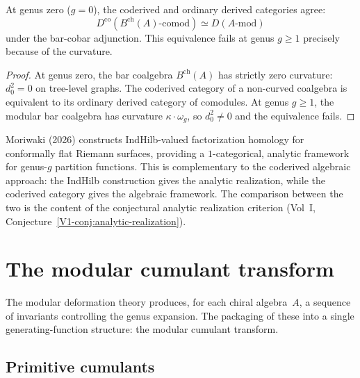\begin{proposition}
At genus zero ($g = 0$), the coderived and ordinary derived categories
agree:
\[
D^{\mathrm{co}}(B^{\mathrm{ch}}(A)\text{-comod})
\simeq
D(A\text{-mod})
\]
under the bar-cobar adjunction. This equivalence fails at genus $g \ge 1$
precisely because of the curvature.
\end{proposition}

\begin{proof}
At genus zero, the bar coalgebra $B^{\mathrm{ch}}(A)$ has strictly
zero curvature: $d_0^2 = 0$ on tree-level graphs. The coderived
category of a non-curved coalgebra is equivalent to its ordinary
derived category of comodules. At genus $g \ge 1$, the modular bar
coalgebra has curvature $\kappa \cdot \omega_g$, so $d_0^2 \neq 0$
and the equivalence fails.
\end{proof}

\begin{remark}
Moriwaki (2026) constructs IndHilb-valued factorization homology for
conformally flat Riemann surfaces, providing a $1$-categorical, analytic
framework for genus-$g$ partition functions. This is complementary to
the coderived algebraic approach: the IndHilb construction gives the
analytic realization, while the coderived category gives the algebraic
framework. The comparison between the two is the content of the
conjectural analytic realization criterion
(Vol~I, Conjecture~\ref*{V1-conj:analytic-realization}).
\end{remark}


\section{The modular cumulant transform}

The modular deformation theory produces, for each chiral algebra~$A$, a
sequence of invariants controlling the genus expansion. The packaging of
these into a single generating-function structure: the modular cumulant
transform.

\subsection{Primitive cumulants}

